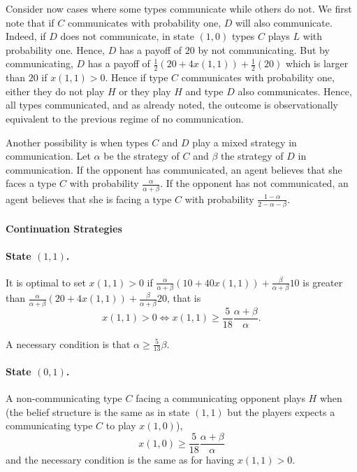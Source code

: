 \documentclass[12pt]{article}
\theoremstyle{break}
\begin{document}
Consider now cases where some types communicate while others do not. We first note that if $C$ communicates with probability one, $D$ will also communicate. Indeed, if $D$ does not communicate, in state $(1,0)$ types $C$ plays $L$ with  probability one. Hence, $D$ has a payoff of $20$ by not communicating. But by communicating, $D$ has a payoff of $\frac{1}{2}(20+4x(1,1))+\frac{1}{2}(20)$ which is larger than $20$ if $x(1,1)>0$. Hence if type $C$ communicates with probability one, either they do not play $H$ or they play $H$ and type $D$ also communicates. Hence, all types communicated, and as already noted, the outcome is observationally equivalent to the previous regime of no communication.

Another possibility is when types $C$ and $D$ play a mixed strategy in communication. Let $\alpha$ be the strategy of $C$ and $\beta$ the strategy of $D$ in communication. If the opponent has communicated, an agent believes that she faces a type $C$ with probability $\frac{\alpha}{\alpha+\beta}$. If the opponent has not communicated, an agent believes that she is facing a type $C$ with probability $\frac{1-\alpha}{2-\alpha-\beta}$.

\paragraph{Continuation Strategies}

\paragraph{State $(1,1)$.} It is optimal to set $x(1,1)>0$ if $\frac{\alpha}{\alpha+\beta}(10+40x(1,1))+\frac{\beta}{\alpha+\beta}10$ is greater than $\frac{\alpha}{\alpha+\beta}(20+4x(1,1))+\frac{\beta}{\alpha+\beta}20$, that is 
\begin{equation}\label{CWC-BR11}
	x(1,1)>0 \Leftrightarrow x(1,1)\geq \frac{5}{18}\frac{\alpha+\beta}{\alpha}.
\end{equation}

A necessary condition is that $\alpha\geq \frac{5}{13}\beta$.

\paragraph{State $(0,1)$.} A non-communicating type $C$ facing a communicating opponent plays $H$ when (the belief structure is the same as in state $(1,1)$ but the players expects a communicating type $C$ to play $x(1,0)$),
\begin{equation}\label{CWC-BR01}
	x(1,0)\geq \frac{5}{18}\frac{\alpha+\beta}{\alpha}
\end{equation}
%
and the necessary condition is the same as for having $x(1,1)>0$.
\end{document}
